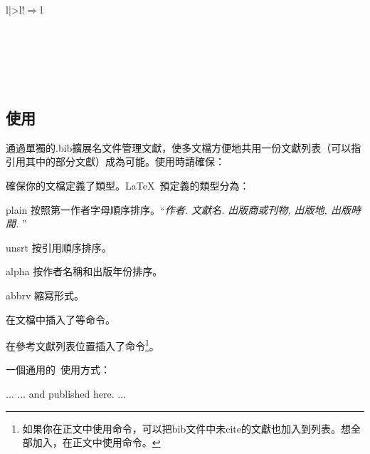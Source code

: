 \begin{table}[!hbt]
\begin{tabular}{l|>{\ttfamily}l!{$\Rightarrow$}l}
 \\
\hline
{} \\
\hline
{} \\
\hline
{} \\
\hline
{} \\
\hline
{} \\
\hline
\end{tabular}
\end{table}

\subsection{\bibtex 使用}
\bibtex 通過單獨的.bib擴展名文件管理文獻，使多文檔方便地共用一份文獻列表（可以指引用其中的部分文獻）成為可能。使用時請確保：
\begin{feae}
\item 確保你的文檔定義了類型。\LaTeX\ 預定義的類型分為：
  \begin{para}
    \item[plain] 按照第一作者字母順序排序。“\textit{作者. 文獻名. 出版商或刊物, 出版地, 出版時間.} ”
    \item[unsrt] 按引用順序排序。
    \item[alpha] 按作者名稱和出版年份排序。
    \item[abbrv] 縮寫形式。
  \end{para}
\item 在文檔中插入了等命令。
\item 在參考文獻列表位置插入了命令\footnote{如果你在正文中使用命令，可以把bib文件中未cite的文獻也加入到列表。想全部加入，在正文中使用命令。}。
\end{feae}

一個通用的\bibtex\ 使用方式：
\begin{latex}


    ...
    ... and published here\cite{Smith93TRB}.
    ...
    

\end{latex}

